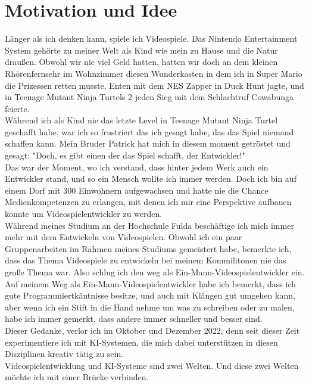 \section{Motivation und Idee}
Länger als ich denken kann, spiele ich Videospiele. Das Nintendo Entertainment System gehörte zu meiner Welt als Kind wie mein zu Hause und die Natur draußen. Obwohl wir nie viel Geld hatten, hatten wir doch an dem kleinen Rhörenfernsehr im Wohnzimmer diesen Wunderkasten in dem ich in Super Mario die Prizessen retten musste, Enten mit dem NES Zapper in Duck Hunt jagte, und in Teenage Mutant Ninja Turtels 2 jeden Sieg mit dem Schlachtruf Cowabunga feierte.
\\
Während ich als Kind nie das letzte Level in Teenage Mutant Ninja Turtel geschafft habe, war ich so frustriert das ich gesagt habe, das das Spiel niemand schaffen kann. Mein Bruder Patrick hat mich in diesem moment getröstet und gesagt: "Doch, es gibt einen der das Spiel schafft, der Entwickler!"
\\
Das war der Moment, wo ich verstand, dass hinter jedem Werk auch ein Entwickler stand, und so ein Mensch wollte ich immer werden. Doch ich bin auf einem Dorf mit 300 Einwohnern aufgewachsen und hatte nie die Chance Medienkompetenzen zu erlangen, mit denen ich mir eine Perspektive aufbauen konnte um Videospielentwickler zu werden.
\\
Während meines Studium an der Hochschule Fulda beschäftige ich mich immer mehr mit dem Entwickeln von Videospielen. Obwohl ich ein paar Gruppenarbeiten im Rahmen meines Studiums gemeistert habe, bemerkte ich, dass das Thema Videospiele zu entwickeln bei meinem Kommilitonen nie das große Thema war. Also schlug ich den weg als Ein-Mann-Videospielentwickler ein.
\\
Auf meinem Weg als Ein-Mann-Videospielentwickler habe ich bemerkt, dass ich gute Programmiertkäntnisse besitze, und auch mit Klängen gut umgehen kann, aber wenn ich ein Stift in die Hand nehme um was zu schreiben oder zu malen, habe ich immer gemerkt, dass andere immer schneller und besser sind.
\\
Dieser Gedanke, verlor ich im Oktober und Dezember 2022, denn seit dieser Zeit experimentiere ich mit KI-Systemen, die mich dabei unterstützen in diesen Disziplinen kreativ tätig zu sein.
\\
Videospielentwicklung und KI-Systeme sind zwei Welten. Und diese zwei Welten möchte ich mit einer Brücke verbinden.
\\

